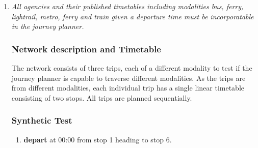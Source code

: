 \documentclass[a4paper,11pt]{article}
\begin{document}
\begin{enumerate}
\item \textit{All agencies and their published timetables including modalities bus, ferry, lightrail, metro, ferry and train given a departure time must be incorporatable in the journey planner.}
\subsubsection*{Network description and Timetable}
The network consists of three trips, each of a different modality to test if the journey planner is capable to traverse different modalities.
As the trips are from different modalities, each individual trip has a single linear timetable consisting of two stops.
All trips are planned sequentially.

\begin{figure}[h]
\vspace{1em}
\raggedleft
\begin{minipage}{305pt}
\end{minipage}
\label{fig:modalities_network}
\vspace{-2em}
\end{figure}

\subsubsection*{Synthetic Test}
\begin{enumerate}
\item \textbf{depart} at 00:00 from stop 1 heading to stop 6.
\end{enumerate}


\end{enumerate}
\end{document}

